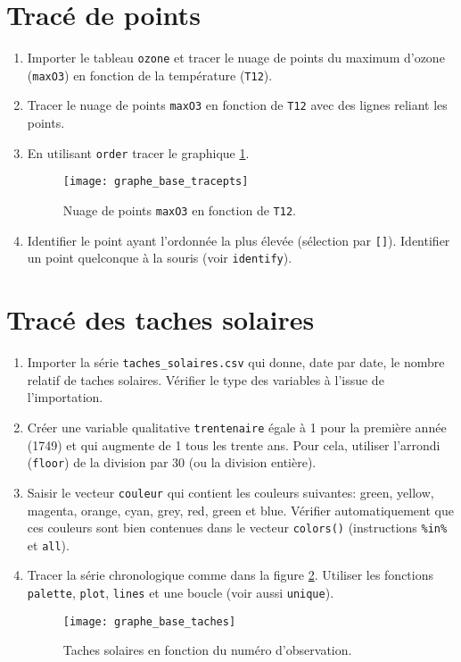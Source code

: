 \documentclass[a4paper,10pt,french]{article}
\newcommand{\fct}[1]{\texttt{#1}}
\newcommand{\code}[1]{\texttt{#1}}
\begin{document}
\section{Trac\'e de points}
\begin{enumerate}
\item Importer le tableau \code{ozone} et tracer le nuage de points du maximum d'ozone (\code{maxO3}) en
  fonction de la temp\'erature (\code{T12}).
\item Tracer le nuage de points \code{maxO3} en
  fonction de \code{T12} avec des lignes reliant les points.
\item En utilisant \code{\fct{order}} tracer le graphique \ref{fig:extracepts}.
  \begin{figure}[H]
    \centering
    \texttt{[image: graphe\_base\_tracepts]}
    \caption{Nuage de points \code{maxO3} en
  fonction de \code{T12}.}
    \label{fig:extracepts}
  \end{figure}
\item Identifier le point ayant l'ordonn\'ee la plus \'elev\'ee (s\'election par \texttt{[]}). Identifier un point quelconque \`a la souris (voir \texttt{identify}).
\end{enumerate}


\section{Trac\'e des taches solaires}
\begin{enumerate}
\item Importer la s\'erie \code{taches\_solaires.csv} qui donne, date par
  date, le nombre relatif de taches solaires. V\'erifier le type des
  variables \`a l'issue de l'importation.
\item Cr\'eer une variable qualitative \code{trentenaire} \'egale \`a 1 pour la premi\`ere
ann\'ee (1749) et qui augmente de 1 tous les trente ans. Pour cela, utiliser l'arrondi
(\code{\fct{floor}}) de la division par 30 (ou la division enti\`ere).
\item Saisir le vecteur \code{couleur} qui contient les couleurs suivantes: green,
  yellow, magenta, orange, cyan, grey, red, green et blue.
  V\'erifier automatiquement que ces couleurs sont bien contenues dans le vecteur \code{\fct{colors}()} (instructions \code{\%in\%} et \code{\fct{all}}).
\item Tracer la s\'erie chronologique comme dans la figure
  \ref{fig:extaches}. Utiliser les fonctions \code{\fct{palette}},
  \code{\fct{plot}}, \code{\fct{lines}} et une boucle (voir aussi
  \code{\fct{unique}}).
  \begin{figure}[H]
    \centering
    \texttt{[image: graphe\_base\_taches]}
    \caption{Taches solaires en fonction du num\'ero d'observation.}
    \label{fig:extaches}
  \end{figure}
\end{enumerate}
\end{document}
